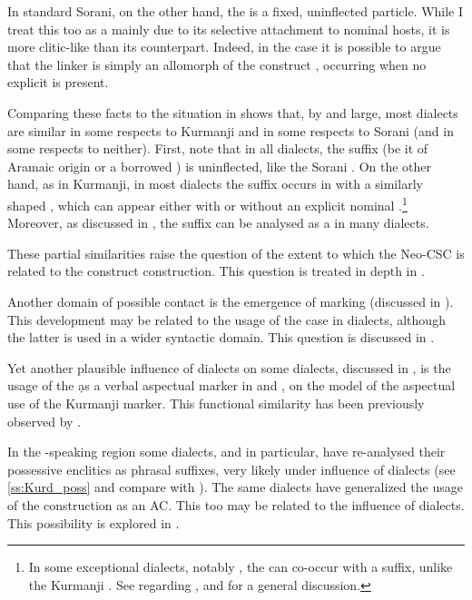 In standard Sorani, on the other hand, the \ez* is a fixed, uninflected particle. While I treat this \ez* too as a  mainly due to its selective attachment to nominal hosts, it is more clitic-like than its \Kur counterpart. Indeed, in the \Sor case it is possible to argue that the linker \ez* is simply an allomorph of the construct \ez*, occurring when no explicit \prim is present. 


Comparing these facts to the situation in  shows that, by and large, most  dialects are similar in some respects to Kurmanji and in some respects to Sorani (and in some respects to neither). First, note that in all  dialects, the \cst* suffix (be it of Aramaic origin or a borrowed \ez*) is uninflected, like the Sorani \ez*. On the other hand, as in Kurmanji, in most  dialects the \cst* suffix occurs in  with a similarly shaped \lnk*, which can appear either with or without an explicit nominal \prim.\footnote{In some exceptional  dialects, notably \JUrm,  the \lnk*  can co-occur with a \cst* suffix, unlike the Kurmanji \lnk*. See  regarding \JUrm, and   for a general discussion.} Moreover, as discussed in , the  \cst* suffix \ed can be analysed as a  in many dialects.

These partial similarities raise the question of the extent to which the  Neo-CSC is related to the construct \ez* construction. This question is treated in depth in .





Another domain of possible contact is the emergence of  \gen* marking (discussed in ). This development may be related to the usage of the \obl* case in \Kur dialects, although the latter is used in a wider syntactic domain. This question is discussed in .

Yet another plausible influence of \Kur dialects on some  dialects, discussed in , is the usage of the \lnk* \d as a verbal aspectual marker in \Sar and \Ank, on the model of the aspectual use of the Kurmanji \ez* marker. This functional similarity has been previously observed by \citet[77ff.]{BorgheroGrammaticalization}.

In the {\Sor}-speaking region some  dialects, \JSan and \JSul in particular, have re-analysed their possessive enclitics as phrasal suffixes, very likely under influence of \Sor dialects (see \ref{ss:Kurd_poss} and compare with ). The same dialects have generalized the usage of the  construction as an AC. This too may be related to the influence of \Sor dialects. This possibility is explored in .



